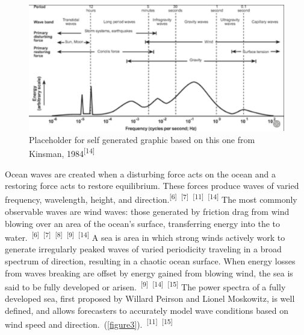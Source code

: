 \documentclass{article}
\begin{document}
\begin{figure} 
    \centering
    \includegraphics[width=1\linewidth]{images/ocean-wave-energy-schematic.png}
    \caption{Placeholder for self generated graphic based on this one from Kinsman, 1984\textsuperscript{[14]}}
    \label{figure2}
\end{figure}

\par{\hspace{.5cm}Ocean waves are created when a disturbing force acts on the ocean and a restoring force acts to restore equilibrium. These forces produce waves of varied frequency, wavelength, height, and direction.\textsuperscript{[6]}~\textsuperscript{[7]}~\textsuperscript{[11]}~\textsuperscript{[14]} The most commonly observable waves are wind waves: those generated by friction drag from wind blowing over an area of the ocean's surface, transferring energy into the to water.~\textsuperscript{[6]}~\textsuperscript{[7]}~\textsuperscript{[8]}~\textsuperscript{[9]}~\textsuperscript{[14]} A sea is area in which strong winds actively work to generate irregularly peaked waves of varied periodicity traveling in a broad spectrum of direction, resulting in a chaotic ocean surface. When energy losses from waves breaking are offset by energy gained from blowing wind, the sea is said to be fully developed or arisen.~\textsuperscript{[9]}~\textsuperscript{[14]}~\textsuperscript{[15]} The power spectra of a fully developed sea, first proposed by Willard Peirson and Lionel Moskowitz, is well defined, and allows forecasters to accurately model wave conditions based on wind speed and direction.~(\cref{figure3}).~\textsuperscript{[11]}~\textsuperscript{[15]}}
\end{document}
